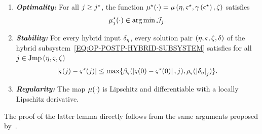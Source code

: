 \begin{lemma}
   \begin{enumerate}
      \item \textit{\textbf{Optimality:}}
      For all $j \ge j^{\star}$, the function $\mu^{\star}(\cdot) = \mu\left( \eta, \varsigma^{\star}, \gamma \left( \varsigma^{\star} \right), \zeta \right)$ satisfies
      \begin{equation*}
        \mu^{\star}_j(\cdot) \in \arg \min \mathcal{J}_j.
      \end{equation*}
      \item \textit{\textbf{Stability:}}
      For every hybrid input $\delta_{\eta}$, every solution pair $\left( \eta, \varsigma, \zeta, \delta \right)$ of the hybrid subsystem~\eqref{EQ:OP-POSTP-HYBRID-SUBSYSTEM}
      satisfies for all $j \in \text{Jmp}\left( \eta, \varsigma, \zeta \right)$
      \begin{equation*}
        \left| \varsigma(j) - \varsigma^{\star}(j) \right| \le \max \{ \beta_{\varsigma}(\left| \varsigma(0) - \varsigma^{\star}(0) \right|,j), \rho_{\varsigma}(\left| \delta_{\eta} \right|_j) \}.
      \end{equation*}
      \item \textit{\textbf{Regularity:}}
      The map $\mu(\cdot)$ is Lipschitz and differentiable with a locally Lipschitz derivative.
   \end{enumerate}
\end{lemma}
The proof of the latter lemma directly follows from the same arguments proposed by~\cite[Proposition 2]{bin2020approximate}.

